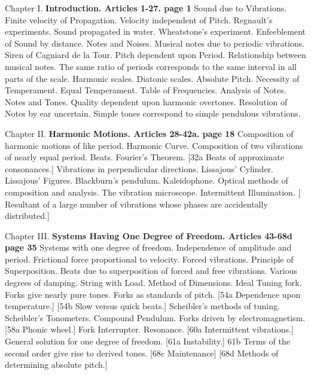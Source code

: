 
Chapter I.  \textbf{Introduction. Articles 1-27. page 1}
Sound due to Vibrations. Finite velocity of Propagation. Velocity independent
of Pitch. Regnault’s experiments. Sound propagated in water.  Wheatstone’s
experiment. Enfeeblement of Sound by distance. Notes and Noises. Musical notes
due to periodic vibrations. Siren of Cagniard de la Tour.  Pitch dependent upon
Period. Relationship between musical notes. The same ratio of periods
corresponds to the same interval in all parts of the scale. Harmonic scales.
Diatonic scales. Absolute Pitch. Necessity of Temperament. Equal Temperament.
Table of Frequencies. Analysis of Notes. Notes and Tones. Quality dependent
upon harmonic overtones. Resolution of Notes by ear uncertain. Simple tones
correspond to simple pendulous vibrations.

Chapter II.  \textbf{Harmonic Motions.  Articles 28-42a. page 18}
Composition of harmonic motions of like period. Harmonic Curve. Composition of
two vibrations of nearly equal period. Beats. Fourier’s Theorem.
[32a Beats of approximate consonances.]
Vibrations in perpendicular directions. Lissajous’ Cylinder.  Lissajous’ Figures.
Blackburn’s pendulum. Kaleidophone. Optical methods of composition and
analysis. The vibration microscope. Intermittent Illumination.
{[} Resultant of a large number of vibrations whose phases are accidentally distributed.{]}

Chapter III.  \textbf{Systems Having One Degree of Freedom.  Articles 43-68d page 35}
Systems with one degree of freedom. Independence of amplitude and period.
Frictional force proportional to velocity. Forced vibrations.  Principle of
Superposition. Beats due to superposition of forced and free vibrations.
Various degrees of damping. String with Load. Method of Dimensions. Ideal Tuning
fork. Forks give nearly pure tones.  Forks as standards of pitch.
[54a Dependence upon temperature.]
[54b Slow versus quick beats.]
Scheibler’s methods of tuning. Scheibler’s Tonometers. Compound Pendulum. Forks
driven by electromagnetism.
[58a  Phonic wheel.]
Fork Interrupter. Resonance.
[60a Intermittent vibrations.]
General solution for one degree of freedom.
[61a Instability.]
61b Terms of the second order give rise to derived tones.
[68c  Maintenance]
[68d Methods of determining absolute pitch.]


